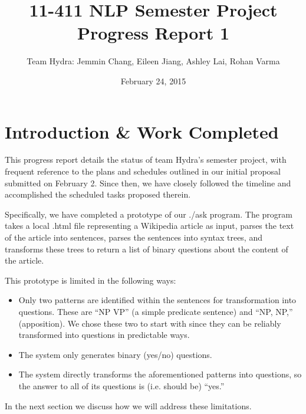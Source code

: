 \documentclass{article}
\begin{document}
\title{11-411 NLP Semester Project \\ Progress Report 1}
\date{February 24, 2015}
\author{Team Hydra: Jemmin Chang, Eileen Jiang, Ashley Lai, Rohan Varma}

\maketitle

\section{Introduction \& Work Completed}
This progress report details the status of team Hydra's semester project, with frequent reference to the plans and schedules outlined in our initial proposal submitted on February 2. Since then, we have closely followed the timeline and accomplished the scheduled tasks proposed therein.

Specifically, we have completed a prototype of our ./ask program. The program takes a local .html file representing a Wikipedia article as input, parses the text of the article into sentences, parses the sentences into syntax trees, and transforms these trees to return a list of binary questions about the content of the article.

This prototype is limited in the following ways:
\begin{itemize}
  \item Only two patterns are identified within the sentences for transformation into questions. These are ``NP VP'' (a simple predicate sentence) and ``NP, NP,'' (apposition). We chose these two to start with since they can be reliably transformed into questions in predictable ways.
  \item The system only generates binary (yes/no) questions.
  \item The system directly transforms the aforementioned patterns into questions, so the answer to all of its questions is (i.e. should be) ``yes.''
\end{itemize}
In the next section we discuss how we will address these limitations.
\end{document}
